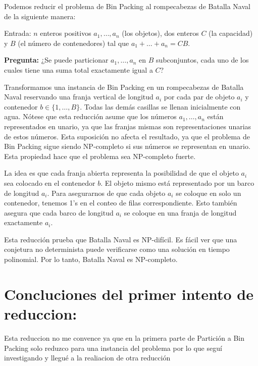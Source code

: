 \documentclass{article}
\begin{document}
Podemos reducir el problema de Bin Packing al rompecabezas de Batalla Naval de la siguiente manera:

Entrada: $n$ enteros positivos $a_1, \dots, a_n$ (los objetos), dos enteros $C$ (la capacidad) y $B$ (el número de contenedores) tal que $a_1 + \dots + a_n = CB$. 

\textbf{Pregunta:} ¿Se puede particionar $a_1, \dots, a_n$ en $B$ subconjuntos, cada uno de los cuales tiene una suma total exactamente igual a $C$?

Transformamos una instancia de Bin Packing en un rompecabezas de Batalla Naval reservando una franja vertical de longitud $a_i$ por cada par de objeto $a_i$ y contenedor $b \in \{1, \dots, B\}$. Todas las demás casillas se llenan inicialmente con agua. Nótese que esta reducción asume que los números $a_1, \dots, a_n$ están representados en unario, ya que las franjas mismas son representaciones unarias de estos números. Esta suposición no afecta el resultado, ya que el problema de Bin Packing sigue siendo NP-completo si sus números se representan en unario. Esta propiedad hace que el problema sea NP-completo fuerte.

La idea es que cada franja abierta representa la posibilidad de que el objeto $a_i$ sea colocado en el contenedor $b$. El objeto mismo está representado por un barco de longitud $a_i$. Para asegurarnos de que cada objeto $a_i$ se coloque en solo un contenedor, tenemos 1's en el conteo de filas correspondiente. Esto también asegura que cada barco de longitud $a_i$ se coloque en una franja de longitud exactamente $a_i$.

Esta reducción prueba que Batalla Naval es NP-difícil. Es fácil ver que una conjetura no determinista puede verificarse como una solución en tiempo polinomial. Por lo tanto, Batalla Naval es NP-completo.




\section*{Concluciones del primer intento de reduccion:}
Esta reduccion no me convence ya que en la primera parte  de Partición a Bin Packing solo reduzco para una instancia del problema por lo que seguí investigando y llegué a la realiacion de otra reducción 
\end{document}
